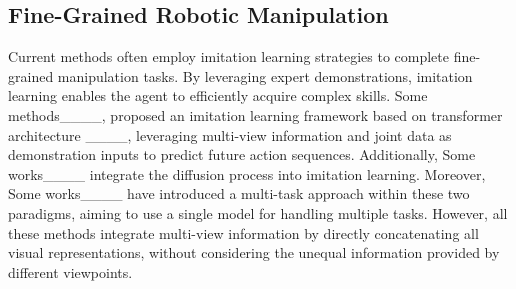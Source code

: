 \subsection{Fine-Grained Robotic Manipulation}
Current methods often employ imitation learning strategies to complete fine-grained manipulation tasks. By leveraging expert demonstrations, imitation learning enables the agent to efficiently acquire complex skills.
Some methods____, proposed an imitation learning framework based on transformer architecture ____, leveraging multi-view information and joint data as demonstration inputs to predict future action sequences. Additionally, Some works____ integrate the diffusion process into imitation learning. Moreover, Some works____ have introduced a multi-task approach within these two paradigms, aiming to use a single model for handling multiple tasks.
However, all these methods integrate multi-view information by directly concatenating all visual representations, without considering the unequal information provided by different viewpoints.

